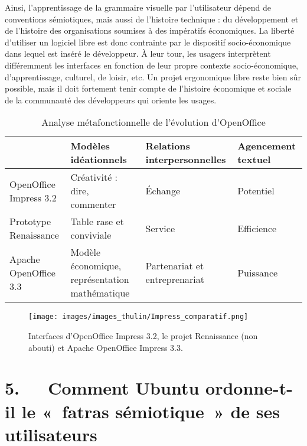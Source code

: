 \documentclass{FramateX}
\begin{document}
\begin{refsection}
Ainsi, l'apprentissage de la grammaire visuelle par l'utilisateur dépend
de conventions sémiotiques, mais aussi de l'histoire technique : du
développement et de l'histoire des organisations soumises à des
impératifs économiques. La liberté d'utiliser un logiciel libre est
donc contrainte par le dispositif socio-économique dans lequel est
inséré le développeur. À leur tour, les usagers interprètent
différemment les interfaces en fonction de leur propre contexte
socio-économique, d'apprentissage, culturel, de loisir, etc. Un projet
ergonomique libre reste bien sûr possible, mais il doit fortement tenir
compte de l'histoire économique et sociale de la communauté des
développeurs qui oriente les usages.

\begin{table}
\begin{scriptsize}
\begin{tabularx}{10cm}{|p{2cm}|p{2cm}|p{2.5cm}|X|}
\hline 
~ & \textbf{Modèles idéationnels}  & \textbf{Relations interpersonnelles}  & \textbf{Agencement textuel} \\
\hline 
OpenOffice Impress 3.2  & Créativité : dire, commenter  & Échange  & Potentiel \\
\hline 
Prototype Renaissance  & Table rase et conviviale  & Service  & Efficience \\
\hline 
Apache OpenOffice 3.3  & Modèle économique, représentation mathématique  & Partenariat et entreprenariat  & Puissance \\
\hline 
\end{tabularx} 
\end{scriptsize}
\caption{Analyse métafonctionnelle de l'évolution d'OpenOffice}
\end{table}



\begin{figure}
\centering
\texttt{[image: images/images\_thulin/Impress\_comparatif.png]}
\caption{Interfaces d'OpenOffice Impress 3.2, le projet Renaissance (non abouti) et Apache OpenOffice Impress 3.3.}
\end{figure}

\section*{5.~~~Comment Ubuntu ordonne-t-il le «~fatras sémiotique~» de ses utilisateurs}
{}



\end{refsection}
\end{document}
